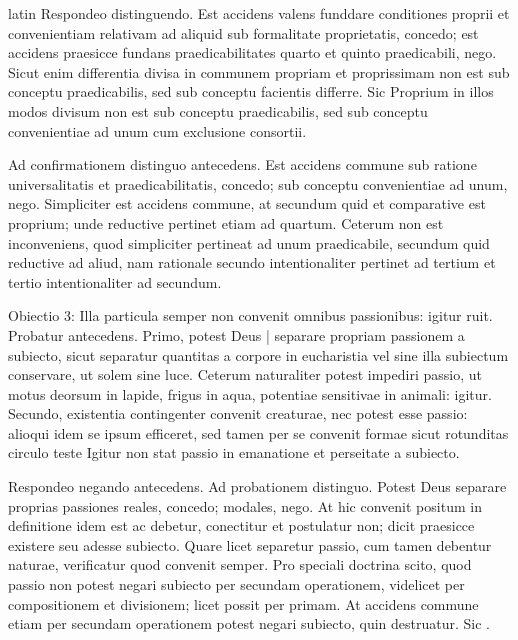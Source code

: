 \begin{otherlanguage*}{latin}
\pstart
Respondeo distinguendo. Est accidens valens funddare conditiones proprii et convenientiam relativam ad aliquid sub formalitate proprietatis, concedo; est accidens praesicce fundans praedicabilitates quarto et quinto praedicabili, nego. Sicut enim differentia divisa in communem propriam et proprissimam non est sub conceptu praedicabilis, sed sub conceptu facientis differre. Sic Proprium in illos modos divisum non est sub conceptu praedicabilis, sed sub conceptu convenientiae ad unum cum exclusione consortii. 
\pend

\pstart
Ad confirmationem distinguo antecedens. Est accidens commune sub ratione universalitatis et praedicabilitatis, concedo; sub conceptu convenientiae ad unum, nego. Simpliciter est accidens commune, at secundum quid et comparative est proprium; unde reductive pertinet etiam ad quartum. Ceterum non est inconveniens, quod simpliciter pertineat ad unum praedicabile, secundum quid reductive ad aliud, nam rationale secundo intentionaliter pertinet ad tertium et tertio intentionaliter ad secundum. 
\pend

\pstart
Obiectio 3:
Illa particula semper non convenit omnibus passionibus:
igitur ruit. Probatur antecedens. Primo, potest Deus \textnormal{|} separare propriam passionem a subiecto, sicut separatur quantitas a corpore in eucharistia vel sine illa subiectum conservare, ut solem sine luce. Ceterum naturaliter potest impediri passio, ut motus deorsum in lapide, frigus in aqua, potentiae sensitivae in animali:
igitur. Secundo, existentia contingenter convenit creaturae, nec potest esse passio:
alioqui idem se ipsum efficeret, sed tamen per se convenit formae sicut rotunditas circulo teste  Igitur non stat passio in emanatione et perseitate a subiecto. 
\pend

\pstart
Respondeo negando antecedens. Ad probationem distinguo. Potest Deus separare proprias passiones reales, concedo; modales, nego. At hic convenit positum in definitione idem est ac debetur, conectitur et postulatur non; dicit praesicce existere seu adesse subiecto. Quare licet separetur passio, cum tamen debentur naturae, verificatur quod convenit semper. Pro speciali doctrina scito, quod passio non potest negari subiecto per secundam operationem, videlicet per compositionem et divisionem; licet possit per primam. At accidens commune etiam per secundam operationem potest negari subiecto, quin destruatur. Sic . 
\pend


\end{otherlanguage*}
